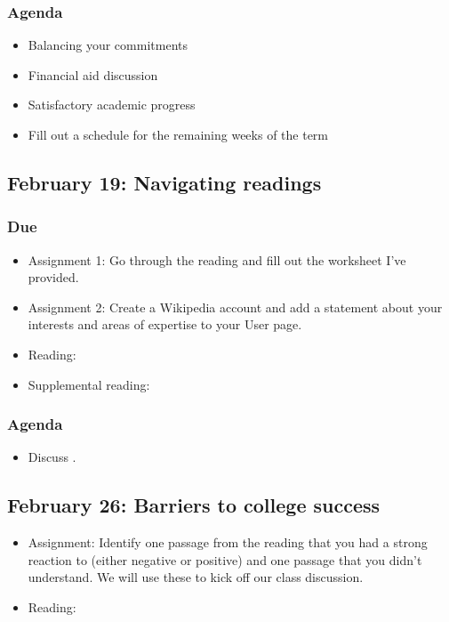 \documentclass[12pt,article,oneside]{memoir}
\begin{document}
\subsubsection{Agenda}
\begin{itemize}
\item Balancing your commitments
\item Financial aid discussion
\item Satisfactory academic progress
\item Fill out a schedule for the remaining weeks of the term
\end{itemize}



\subsection{February 19: Navigating readings}
\subsubsection{Due}
\begin{itemize}
 \item Assignment 1: Go through the reading and fill out the worksheet I've provided.
 \item Assignment 2: Create a Wikipedia account and add a statement about your interests and areas of expertise to your User page.
 \item Reading: \cite{guillory2008s}
 \item Supplemental reading: \cite{rosenberg}
\end{itemize}

\subsubsection{Agenda}
\begin{itemize}
\item Discuss \cite{guillory2008s}.
\end{itemize}


\subsection{February 26: Barriers to college success}
\begin{itemize}
 \item Assignment: Identify one passage from the reading that you had a strong reaction to (either negative or positive) and one passage that you didn't understand.  We will use these to kick off our class discussion.
 \item Reading: \cite{guillory2008s}
\end{itemize}
\end{document}
